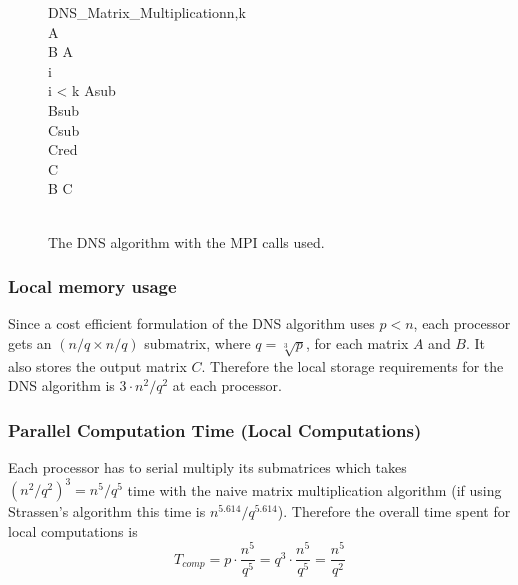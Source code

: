 \documentclass{article}
\begin{document}
\begin{figure}

\begin{pseudocode}[ruled]{DNS\_Matrix\_Multiplication}{n,k}
 \\
A \GETS {} \\
B \GETS A \\
i  \\

\WHILE i < k \DO
\BEGIN
	Asub \GETS {} \\
	Bsub \GETS {} \\
	Csub \GETS {} \\
	
	Cred \GETS {} \\
	C \GETS {} \\

	B \GETS C \\
\END \vspace{10pt} \\

\end{pseudocode}
\caption{The DNS algorithm with the MPI calls used.}
\end{figure}


\subsubsection{Local memory usage}

Since a cost efficient formulation of the DNS algorithm uses $p < n$, each
processor gets an $(n/q \times n/q)$ submatrix, where $q = \sqrt[3]{p}$, for
each matrix $A$ and $B$.  It also stores the output matrix $C$.  Therefore the
local storage requirements for the DNS algorithm is $3 \cdot n^2 / q^2$ at each
processor.

\subsubsection{Parallel Computation Time (Local Computations)}

Each processor has to serial multiply its submatrices which takes $(n^2/q^2)^3 =
n^5/q^5$ time with the naive matrix multiplication algorithm (if using
Strassen's algorithm this time is $n^{5.614}/q^{5.614}$).  Therefore the
overall time spent for local computations is $$T_{{comp}} = p\cdot
\frac{n^5}{q^5} = q^3 \cdot \frac{n^5}{q^5} = \frac{n^5}{q^2}$$
\end{document}

